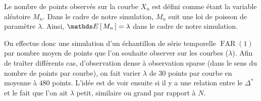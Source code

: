 Le nombre de points observés sur la courbe $X_n$ est défini comme étant la variable aléatoire $M_n$. Dans le cadre de notre simulation, $M_n$ suit une loi de poisson de paramètre $\lambda$. Ainsi, $\esperance{M_n} = \lambda$ dans le cadre de notre simulation.

On effectue donc une simulation d'un échantillon de série temporelle $\operatorname{FAR}(1)$ par nombre moyen de points que l'on souhaite observer sur les courbes ($\lambda$). Afin de traîter différents cas, d'observation \og dense \fg à observation \og sparse \fg (dans le sens du nombre de points par courbe), on fait varier $\lambda$ de $30$ points par courbe en moyenne à $480$ points. L'idée est de voir ensuite si il y a une relation entre le $\Delta^*$ et le fait que l'on ait $\lambda$ petit, similaire ou grand par rapport à $N$.